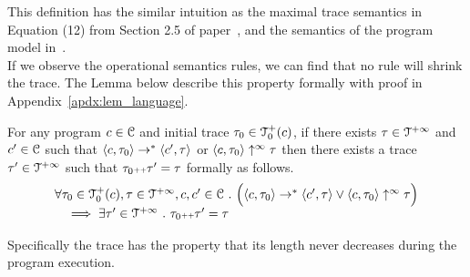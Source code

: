 %
This definition has the similar intuition as the maximal trace semantics in Equation (12) from Section 2.5 of paper~\cite{Cousot19a}, and the semantics of the program model in~\cite{SinnZV17}.
\\
If we observe the operational semantics rules, we can find that no rule will shrink the trace. 
The Lemma below describe this property formally with proof in Appendix~\ref{apdx:lem_language}. 
\begin{lem}
  \label{lem:psRB-tracenondec}
  For any program $c \in \mathcal{C}$ and initial trace $\mathtt{\tau}_0 \in \mathcal{T}^{+}_0(c)$,
  if there exists $\mathtt{\tau} \in \mathcal{T}^{+\infty}$ and $c' \in \mathcal{C} $ such that $\langle c, \mathtt{\tau}_0 \rangle \rightarrow^{*} \langle c', \mathtt{\tau} \rangle $ or 
  $\langle c, \mathtt{\tau}_0 \rangle \uparrow^{\infty} \mathtt{\tau}$  
  then there exists a trace $\mathtt{\tau}' \in \mathcal{T}^{+\infty}$ such that $\mathtt{\tau}_0 {\scriptscriptstyle ++} \mathtt{\tau}' = \mathtt{\tau}$ formally as follows.
  \[
    \begin{array}{l}
    \forall \mathtt{\tau}_0 \in \mathcal{T}^{+}_0(c), \mathtt{\tau} \in \mathcal{T}^{+\infty}, c, c' \in \mathcal{C} ~.~
    \Big( \langle c, \mathtt{\tau}_0 \rangle \rightarrow^{*} \langle c', \mathtt{\tau} \rangle 
    \lor  \langle c, \mathtt{\tau}_0 \rangle \uparrow^{\infty} \mathtt{\tau} \Big)
    \\ \quad
    \implies \exists \mathtt{\tau}' \in \mathcal{T}^{+\infty} ~.~ \mathtt{\tau}_0 {\scriptscriptstyle ++} \mathtt{\tau}' = \mathtt{\tau} 
    \end{array}
    \]
  \end{lem}
  Specifically the trace has the property that its length never decreases during the program execution.
